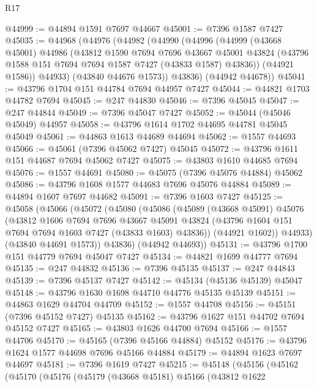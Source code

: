 \begin{lexlean}{R17}
\begin{coremodule}
@44999 := @44894 @1591 @7697 @44667
@45001 := @7396 @1587 @7427
@45035 := @44968
    (@44976
      (@44982
        (@44990
          (@44996
            (@44999
              (@43668 @45001)
              @44986
              (@43812
                @1590
                @7694
                @7696
                @43667
                @45001
                @43824
                (@43796 @1588 @151 @7694 @7694 @1587 @7427 (@43833 @1587) @43836))
              (@44921 @1586))
            @44933)
          (@43840 @44676 @1573))
        @43836)
      (@44942 @44678))
@45041 := @43796 @1704 @151 @44784 @7694 @44957 @7427
@45044 := @44821 @1703 @44782 @7694
@45045 := @247 @44830
@45046 := @7396 @45045
@45047 := @247 @44844
@45049 := @7396 @45047 @7427
@45052 := @45044 (@45046 @45049) @44957
@45058 := @43796 @1614 @1702 @44695 @44781 @45045 @45049
@45061 := @44863 @1613 @44689 @44694
@45062 := @1557 @44693
@45066 := @45061 (@7396 @45062 @7427) @45045
@45072 := @43796 @1611 @151 @44687 @7694 @45062 @7427
@45075 := @43803 @1610 @44685 @7694
@45076 := @1557 @44691
@45080 := @45075 (@7396 @45076 @44884) @45062
@45086 := @43796 @1608 @1577 @44683 @7696 @45076 @44884
@45089 := @44894 @1607 @7697 @44682
@45091 := @7396 @1603 @7427
@45125 := @45058
    (@45066
      (@45072
        (@45080
          (@45086
            (@45089
              (@43668 @45091)
              @45076
              (@43812
                @1606
                @7694
                @7696
                @43667
                @45091
                @43824
                (@43796 @1604 @151 @7694 @7694 @1603 @7427 (@43833 @1603) @43836))
              (@44921 @1602))
            @44933)
          (@43840 @44691 @1573))
        @43836)
      (@44942 @44693))
@45131 := @43796 @1700 @151 @44779 @7694 @45047 @7427
@45134 := @44821 @1699 @44777 @7694
@45135 := @247 @44832
@45136 := @7396 @45135
@45137 := @247 @44843
@45139 := @7396 @45137 @7427
@45142 := @45134 (@45136 @45139) @45047
@45148 := @43796 @1630 @1698 @44710 @44776 @45135 @45139
@45151 := @44863 @1629 @44704 @44709
@45152 := @1557 @44708
@45156 := @45151 (@7396 @45152 @7427) @45135
@45162 := @43796 @1627 @151 @44702 @7694 @45152 @7427
@45165 := @43803 @1626 @44700 @7694
@45166 := @1557 @44706
@45170 := @45165 (@7396 @45166 @44884) @45152
@45176 := @43796 @1624 @1577 @44698 @7696 @45166 @44884
@45179 := @44894 @1623 @7697 @44697
@45181 := @7396 @1619 @7427
@45215 := @45148
    (@45156
      (@45162
        (@45170
          (@45176
            (@45179
              (@43668 @45181)
              @45166
              (@43812
                @1622

\end{coremodule}
\end{lexlean}
